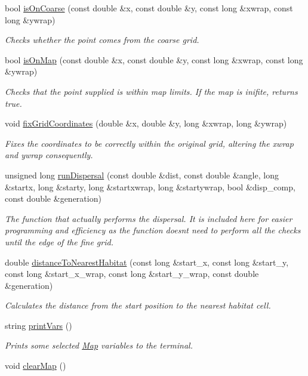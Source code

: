 \begin{DoxyCompactItemize}
bool \hyperlink{class_landscape_a88b7191cdc10684eb6a851350d2f7a01}{is\+On\+Coarse} (const double \&x, const double \&y, const long \&xwrap, const long \&ywrap)
\begin{DoxyCompactList}\small\item\em Checks whether the point comes from the coarse grid. \end{DoxyCompactList}\item 
bool \hyperlink{class_landscape_abe24da20e362bd88f3794e4d8d5ccafb}{is\+On\+Map} (const double \&x, const double \&y, const long \&xwrap, const long \&ywrap)
\begin{DoxyCompactList}\small\item\em Checks that the point supplied is within map limits. If the map is inifite, returns true. \end{DoxyCompactList}\item 
void \hyperlink{class_landscape_a5aa0fca1b87ab838ebab933ef6daf4a2}{fix\+Grid\+Coordinates} (double \&x, double \&y, long \&xwrap, long \&ywrap)
\begin{DoxyCompactList}\small\item\em Fixes the coordinates to be correctly within the original grid, altering the xwrap and ywrap consequently. \end{DoxyCompactList}\item 
unsigned long \hyperlink{class_landscape_aedc33de89997456d53cceb3e4e424e64}{run\+Dispersal} (const double \&dist, const double \&angle, long \&startx, long \&starty, long \&startxwrap, long \&startywrap, bool \&disp\+\_\+comp, const double \&generation)
\begin{DoxyCompactList}\small\item\em The function that actually performs the dispersal. It is included here for easier programming and efficiency as the function doesn\textquotesingle{}t need to perform all the checks until the edge of the fine grid. \end{DoxyCompactList}\item 
double \hyperlink{class_landscape_a3a552903c925b9769ecc2cad5b051682}{distance\+To\+Nearest\+Habitat} (const long \&start\+\_\+x, const long \&start\+\_\+y, const long \&start\+\_\+x\+\_\+wrap, const long \&start\+\_\+y\+\_\+wrap, const double \&generation)
\begin{DoxyCompactList}\small\item\em Calculates the distance from the start position to the nearest habitat cell. \end{DoxyCompactList}\item 
string \hyperlink{class_landscape_a9b867a59c88f754bae6788451845b698}{print\+Vars} ()
\begin{DoxyCompactList}\small\item\em Prints some selected \hyperlink{class_map}{Map} variables to the terminal. \end{DoxyCompactList}\item 
void \hyperlink{class_landscape_a28d01a593cbaf9d8fde9c2e1da996f91}{clear\+Map} ()\hypertarget{class_landscape_a28d01a593cbaf9d8fde9c2e1da996f91}{}\label{class_landscape_a28d01a593cbaf9d8fde9c2e1da996f91}


\end{DoxyCompactItemize}
